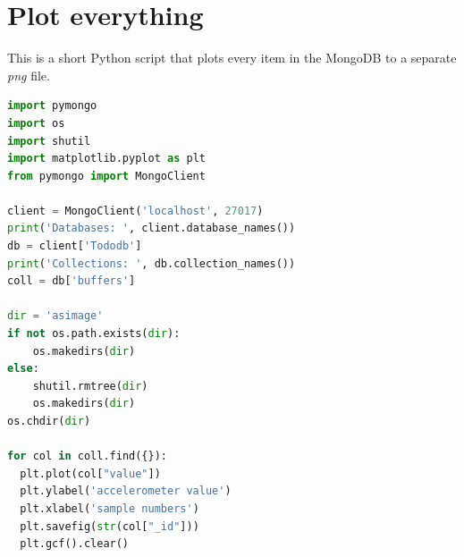 \documentclass[12pt, a4paper, portrait]{article}
\begin{document}
\pagebreak
\section{Plot everything}
This is a short Python script that plots every item in the MongoDB to a separate \textit{png} file.
\begin{lstlisting}[language=Python]
import pymongo
import os
import shutil
import matplotlib.pyplot as plt
from pymongo import MongoClient

client = MongoClient('localhost', 27017)
print('Databases: ', client.database_names())
db = client['Tododb']
print('Collections: ', db.collection_names())
coll = db['buffers']

dir = 'asimage'
if not os.path.exists(dir):
    os.makedirs(dir)
else:
    shutil.rmtree(dir)
    os.makedirs(dir)
os.chdir(dir)

for col in coll.find({}):
  plt.plot(col["value"])
  plt.ylabel('accelerometer value')
  plt.xlabel('sample numbers')
  plt.savefig(str(col["_id"]))
  plt.gcf().clear()
\end{lstlisting}
\end{document}
